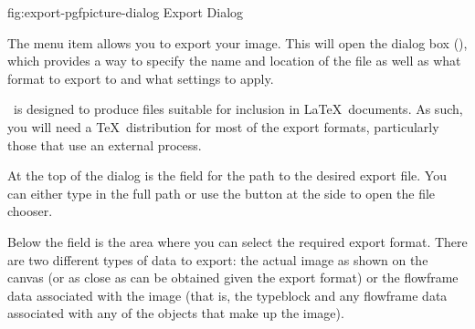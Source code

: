 \FloatFig
 {fig:export-pgfpicture-dialog}
 {}
 {Export Dialog}

The  menu item allows you to export your image.
This will open the  dialog box
(), which provides a way to
specify the name and location of the file as well as what format to
export to and what settings to apply. 

\begin{information}
\FlowframTk\ is designed to produce files suitable for inclusion in
\LaTeX\ documents. As such, you will need a \TeX\ distribution for
most of the export formats, particularly those that use an external
process.
\end{information}


At the top of the  dialog is the
 field for the path to
the desired export file. You can either type in the full path or use
the  button at the side to open the file chooser.


Below the  field is the  area where you
can select the required export format.
There are two different types of data to export: the actual image as
shown on the \gls{canvas} (or as close as can be obtained given the
export format) or the \gls{flowframe} data associated with the
image (that is, the \gls{typeblock} and any \gls{flowframe} data
associated with any of the \glspl{object} that make up the image).


